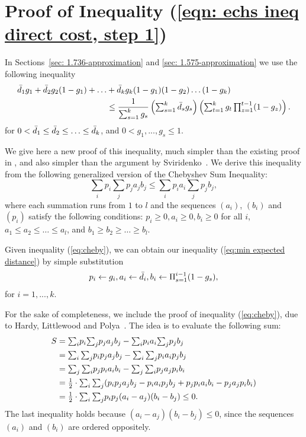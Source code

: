 \documentclass[oneside,final]{ucr}
\begin{document}
\section{Proof of Inequality (\ref{eqn: echs ineq direct
    cost, step 1})}
\label{sec: ECHSinequality}

In Sections~\ref{sec: 1.736-approximation} and \ref{sec:
  1.575-approximation} we use the following inequality
%
\begin{align}
  \label{eq:min expected distance}
  {\bar d}_1 g_1 + {\bar d}_2 g_2 (1-g_1) +
  \ldots &+ {\bar d}_k g_k (1-g_1) (1-g_2) \ldots (1-g_k)\\ \notag
  &\leq \frac{1}{\sum_{s=1}^k g_s} \left(\textstyle\sum_{s=1}^k {\bar d}_s g_s\right)\left(\textstyle\sum_{t=1}^k g_t \textstyle\prod_{z=1}^{t-1} (1-g_z)\right).
\end{align}
%
for $0 < {\bar d}_1\leq {\bar d}_2 \leq \ldots \leq {\bar d}_k$, and
$0 < g_1,...,g_s \le 1$.

\medskip

We give here a new proof of this inequality, much simpler
than the existing proof in \cite{ChudakS04}, and also
simpler than the argument by Sviridenko~\cite{Svi02}.  We
derive this inequality from the following generalized
version of the Chebyshev Sum Inequality:
%
\begin{equation}
  \label{eq:cheby}
  \textstyle{\sum_{i}} p_i \textstyle{\sum_j} p_j a_j b_j \leq \textstyle{\sum_i} p_i a_i \textstyle{\sum_j} p_j b_j,
\end{equation}
%
where each summation runs from $1$ to $l$ and the sequences
$(a_i)$, $(b_i)$ and $(p_i)$ satisfy the following
conditions: $p_i\geq 0, a_i \geq 0, b_i \geq 0$ for all $i$,
$a_1\leq a_2 \leq \ldots \leq a_l$, and $b_1 \geq b_2 \geq
\ldots \geq b_l$.

Given inequality (\ref{eq:cheby}), we can obtain our
inequality (\ref{eq:min expected distance}) by simple
substitution
%
\begin{equation*}
  p_i \leftarrow g_i, a_i \leftarrow {\bar d}_i, b_i \leftarrow
  \Pi_{s=1}^{i-1} (1-g_s),
\end{equation*}
%
for $i = 1,...,k$.

For the sake of completeness, we include the proof of
inequality (\ref{eq:cheby}), due to Hardy, Littlewood and
Polya~\cite{HardyLP88}. The idea is to evaluate the
following sum:
%
\begin{align*}
  S &= \textstyle{\sum_i} p_i \textstyle{\sum_j} p_j a_j b_j - \textstyle{\sum_i} p_i a_i \textstyle{\sum_j} p_j b_j
	\\
  & = \textstyle{\sum_i \sum_j} p_i p_j a_j b_j - \textstyle{\sum_i \sum_j} p_i a_i p_j b_j
	\\
  & = \textstyle{\sum_j \sum_i} p_j p_i a_i b_i - \textstyle{\sum_j \sum _i} p_j a_j p_i b_i
	\\
	&= {\mbox{$\frac{1}{2}$}} \cdot \textstyle{\sum_i \sum_j} (p_i p_j a_j b_j - p_i a_i p_j b_j + p_j p_i a_i
  							b_i - p_j a_j p_i b_i)
\\
  &= {\mbox{$\frac{1}{2}$}} \cdot \textstyle{\sum_i \sum_j} p_i p_j (a_i - a_j)(b_i - b_j) \leq 0.
\end{align*}
The last inequality holds because $(a_i-a_j)(b_i-b_j) \leq
0$, since the sequences $(a_i)$ and $(b_i)$ are ordered
oppositely.
\end{document}
